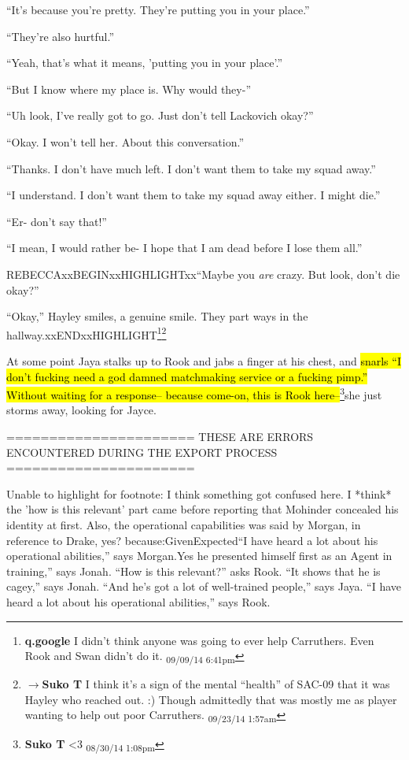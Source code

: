 ``It's because you're pretty.  They're putting you in your place.''

``They're also hurtful.''

``Yeah, that's what it means, 'putting you in your place'.''

``But I know where my place is.  Why would they-''

``Uh look, I've really got to go.  Just don't tell Lackovich okay?''

``Okay.  I won't tell her.  About this conversation.''

``Thanks.  I don't have much left.  I don't want them to take my squad away.''

``I understand. I don't want them to take my squad away either.  I might die.''

``Er- don't say that!''

``I mean, I would rather be- I hope that I am dead before I lose them all.''

REBECCAxxBEGINxxHIGHLIGHTxx``Maybe you \textit{are} crazy.  But look, don't die okay?''

``Okay,'' Hayley smiles, a genuine smile.  They part ways in the hallway.xxENDxxHIGHLIGHT\footnote{\textbf{q.google }I didn't think anyone was going to ever help Carruthers.  Even Rook and Swan didn't do it. \textsubscript{09/09/14 6:41pm}}\footnote{$\rightarrow$\textbf{Suko T }I think it's a sign of the mental ``health'' of SAC-09 that it was Hayley who reached out. :)  Though admittedly that was mostly me as player wanting to help out poor Carruthers. \textsubscript{09/23/14 1:57am}}





At some point Jaya stalks up to Rook and jabs a finger at his chest, and \hl{snarls ``I don't fucking need a god damned matchmaking service or a fucking pimp.'' Without waiting for a response-- because come-on, this is Rook here--}\footnote{\textbf{Suko T }\textless 3 \textsubscript{08/30/14 1:08pm}}she just storms away, looking for Jayce.


\iffalse

======================
THESE ARE ERRORS ENCOUNTERED DURING THE EXPORT PROCESS
======================

	Unable to highlight for footnote: I think something got confused here. I *think* the 'how is this relevant' part came before reporting that Mohinder concealed his identity at first. Also, the operational capabilities was said by Morgan, in reference to Drake, yes? because:GivenExpected“I have heard a lot about his operational abilities,” says Morgan.Yes he presented himself first as an Agent in training,” says Jonah.
“How is this relevant?” asks Rook.
“It shows that he is cagey,” says Jonah.
“And he’s got a lot of well-trained people,” says Jaya.
“I have heard a lot about his operational abilities,” says Rook.

